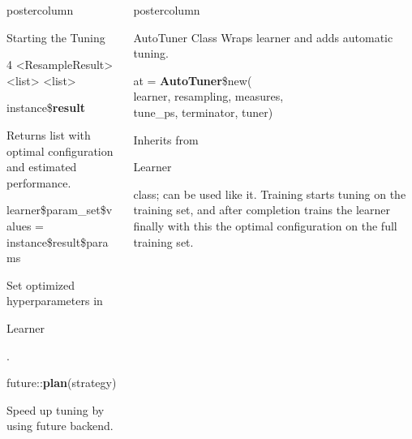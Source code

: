 \documentclass{beamer}
\newlength{\columnheight} %
\newcommand{\codeinline}[1]{\begin{codeboxinline}#1\end{codeboxinline}}
\begin{document}
\begin{frame}[fragile]{}
\begin{columns}
\begin{column}{.245\textwidth}
\begin{beamercolorbox}[center]{postercolumn}
\begin{minipage}{.98\textwidth}
{\begin{myblock}{Starting the Tuning}
\begin{codeboxmultiline}[width=27cm]
{									\phantom{n}4 \space\space\space\space\space{} \space\space <ResampleResult> \space\space\space{} <list> <list> \space 0.2721586}
							\end{codeboxmultiline}
							\vspace{1em}
							\begin{codebox}
								instance\$\textbf{result}
							\end{codebox}
							Returns list with optimal configuration and estimated performance.
							\\
							\begin{codebox}
								{\footnotesize learner\$param\_set\$values = instance\$result\$params}
							\end{codebox}
							Set optimized hyperparameters in \codeinline{Learner}.
							\\
							\begin{codebox}
								future::\textbf{plan}(strategy)
							\end{codebox}
							Speed up tuning by using future backend.
						\end{myblock}
						\vfill}
				\end{minipage}
			\end{beamercolorbox}
		\end{column}
		\begin{column}{.245\textwidth}
			\begin{beamercolorbox}[center]{postercolumn}
				\begin{minipage}{.98\textwidth}
					\parbox[t][\columnheight]{\textwidth}{
						\begin{myblock}{AutoTuner Class}
							Wraps learner and adds automatic tuning. 
							\\
							\begin{codeboxmultiline}[width=20cm]
								at = \textbf{AutoTuner}\$new(\\
								\hspace*{1ex}learner, resampling, measures, \\
								\hspace*{1ex}tune\_ps, terminator, tuner)
							\end{codeboxmultiline}
							\vspace{1em}
                            Inherits from \codeinline{Learner} class; can be used like it. 
                            Training starts tuning on the training set,
                            and after completion trains the learner finally with 
                            this the optimal configuration on the full training set.

\end{myblock}}
\end{minipage}
\end{beamercolorbox}
\end{column}
\end{columns}
\end{frame}
\end{document}
